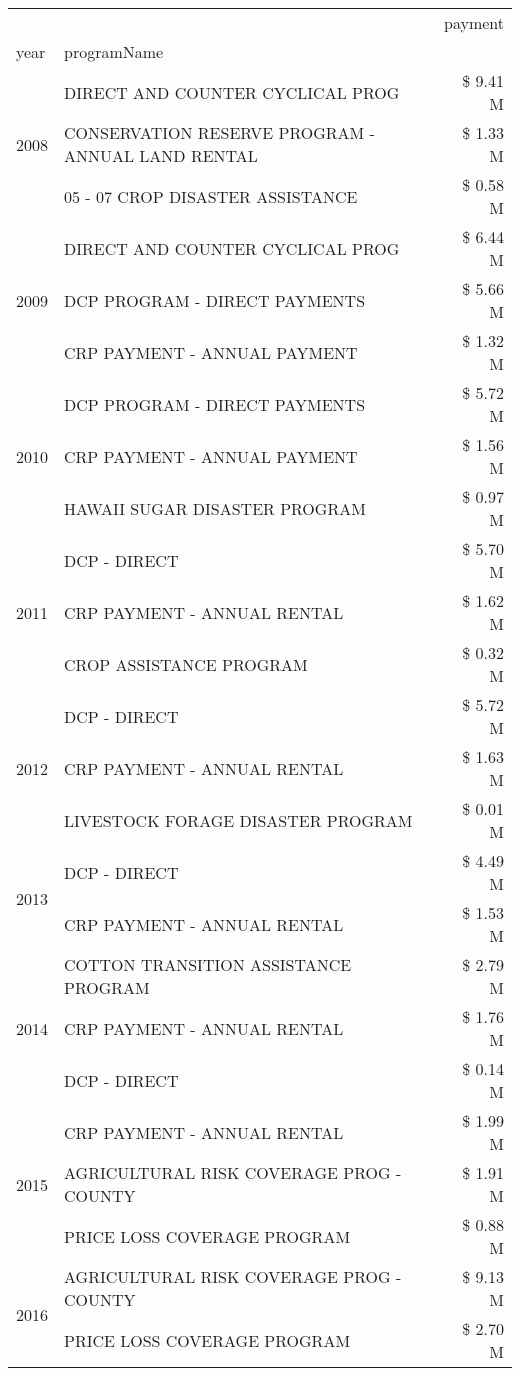 \begin{tabular}{llr}
\toprule
 &  & payment \\
year & programName &  \\
\midrule
\multirow[t]{3}{*}{2008} & DIRECT AND COUNTER CYCLICAL PROG & \$ 9.41 M \\
 & CONSERVATION RESERVE PROGRAM - ANNUAL LAND RENTAL & \$ 1.33 M \\
 & 05 - 07 CROP DISASTER ASSISTANCE & \$ 0.58 M \\
\cline{1-3}
\multirow[t]{3}{*}{2009} & DIRECT AND COUNTER CYCLICAL PROG & \$ 6.44 M \\
 & DCP PROGRAM - DIRECT PAYMENTS & \$ 5.66 M \\
 & CRP PAYMENT - ANNUAL PAYMENT & \$ 1.32 M \\
\cline{1-3}
\multirow[t]{3}{*}{2010} & DCP PROGRAM - DIRECT PAYMENTS & \$ 5.72 M \\
 & CRP PAYMENT - ANNUAL PAYMENT & \$ 1.56 M \\
 & HAWAII SUGAR DISASTER PROGRAM & \$ 0.97 M \\
\cline{1-3}
\multirow[t]{3}{*}{2011} & DCP - DIRECT & \$ 5.70 M \\
 & CRP PAYMENT - ANNUAL RENTAL & \$ 1.62 M \\
 & CROP ASSISTANCE PROGRAM & \$ 0.32 M \\
\cline{1-3}
\multirow[t]{3}{*}{2012} & DCP - DIRECT & \$ 5.72 M \\
 & CRP PAYMENT - ANNUAL RENTAL & \$ 1.63 M \\
 & LIVESTOCK FORAGE DISASTER PROGRAM & \$ 0.01 M \\
\cline{1-3}
\multirow[t]{2}{*}{2013} & DCP - DIRECT & \$ 4.49 M \\
 & CRP PAYMENT - ANNUAL RENTAL & \$ 1.53 M \\
\cline{1-3}
\multirow[t]{3}{*}{2014} & COTTON TRANSITION ASSISTANCE PROGRAM & \$ 2.79 M \\
 & CRP PAYMENT - ANNUAL RENTAL & \$ 1.76 M \\
 & DCP - DIRECT & \$ 0.14 M \\
\cline{1-3}
\multirow[t]{3}{*}{2015} & CRP PAYMENT - ANNUAL RENTAL & \$ 1.99 M \\
 & AGRICULTURAL RISK COVERAGE PROG - COUNTY & \$ 1.91 M \\
 & PRICE LOSS COVERAGE PROGRAM & \$ 0.88 M \\
\cline{1-3}
\multirow[t]{3}{*}{2016} & AGRICULTURAL RISK COVERAGE PROG - COUNTY & \$ 9.13 M \\
 & PRICE LOSS COVERAGE PROGRAM & \$ 2.70 M \\

\end{tabular}
